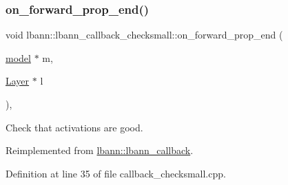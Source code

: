 \mbox{\label{classlbann_1_1lbann__callback__checksmall_a2f50695feb1444145bae251f2e94b721}} 
\subsubsection{\texorpdfstring{on\+\_\+forward\+\_\+prop\+\_\+end()}{on\_forward\_prop\_end()}}
{\footnotesize\ttfamily void lbann\+::lbann\+\_\+callback\+\_\+checksmall\+::on\+\_\+forward\+\_\+prop\+\_\+end (\begin{DoxyParamCaption}\item[{\hyperlink{classlbann_1_1model}{model} $\ast$}]{m,  }\item[{\hyperlink{classlbann_1_1Layer}{Layer} $\ast$}]{l }\end{DoxyParamCaption})\hspace{0.3cm}{\ttfamily [override]}, {\ttfamily [virtual]}}

Check that activations are good. 

Reimplemented from \hyperlink{classlbann_1_1lbann__callback_a5eff0a59fbce98a981d9cdd0547a3ad5}{lbann\+::lbann\+\_\+callback}.



Definition at line 35 of file callback\+\_\+checksmall.\+cpp.


